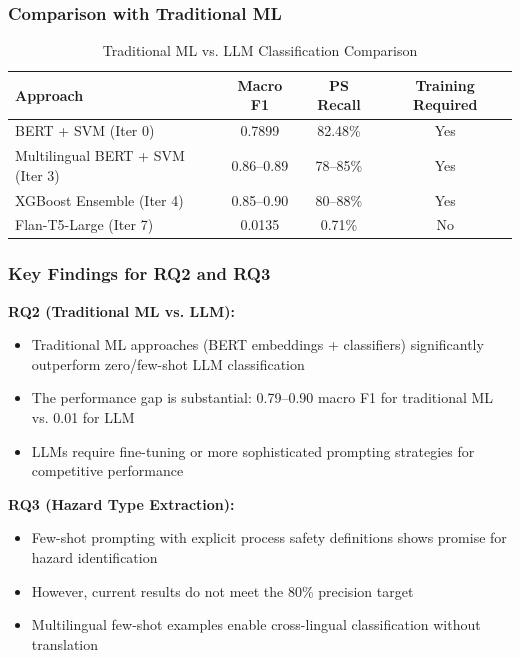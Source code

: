 \documentclass[11pt, titlepage, bibliography=totoc]{scrreprt}
\begin{document}
\subsubsection{Comparison with Traditional ML}

\begin{table}[htbp]
\centering
\caption{Traditional ML vs. LLM Classification Comparison}
\label{tab:ml-vs-llm}
\begin{tabular}{@{}lccc@{}}
\toprule
\textbf{Approach} & \textbf{Macro F1} & \textbf{PS Recall} & \textbf{Training Required} \\
\midrule
BERT + SVM (Iter 0) & 0.7899 & 82.48\% & Yes \\
Multilingual BERT + SVM (Iter 3) & 0.86--0.89 & 78--85\% & Yes \\
XGBoost Ensemble (Iter 4) & 0.85--0.90 & 80--88\% & Yes \\
Flan-T5-Large (Iter 7) & 0.0135 & 0.71\% & No \\
\bottomrule
\end{tabular}
\end{table}

\subsubsection{Key Findings for RQ2 and RQ3}

\textbf{RQ2 (Traditional ML vs. LLM):}
\begin{itemize}
    \item Traditional ML approaches (BERT embeddings + classifiers) significantly outperform zero/few-shot LLM classification
    \item The performance gap is substantial: 0.79--0.90 macro F1 for traditional ML vs. 0.01 for LLM
    \item LLMs require fine-tuning or more sophisticated prompting strategies for competitive performance
\end{itemize}

\textbf{RQ3 (Hazard Type Extraction):}
\begin{itemize}
    \item Few-shot prompting with explicit process safety definitions shows promise for hazard identification
    \item However, current results do not meet the 80\% precision target
    \item Multilingual few-shot examples enable cross-lingual classification without translation
\end{itemize}
\end{document}
